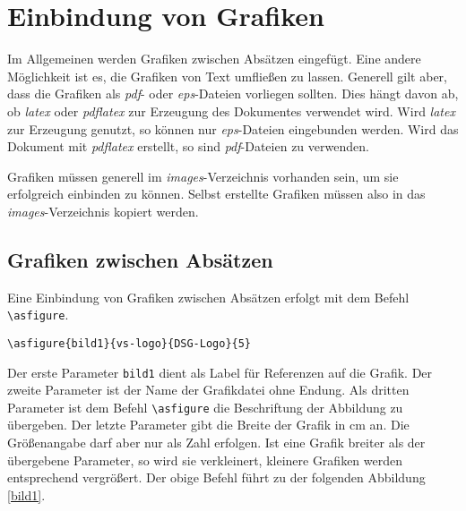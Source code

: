 %
\section{Einbindung von Grafiken}
%
Im Allgemeinen werden Grafiken zwischen Absätzen eingefügt. Eine andere
Möglichkeit ist es, die Grafiken von Text umfließen zu lassen. Generell gilt
aber, dass die Grafiken als \emph{pdf}- oder \emph{eps}-Dateien vorliegen
sollten. Dies hängt davon ab, ob \emph{latex} oder \emph{pdflatex} zur Erzeugung
des Dokumentes verwendet wird. Wird \emph{latex} zur Erzeugung genutzt, so
können nur \emph{eps}-Dateien eingebunden werden. Wird das Dokument mit
\emph{pdflatex} erstellt, so sind \emph{pdf}-Dateien zu verwenden.

Grafiken müssen generell im \emph{images}-Verzeichnis vorhanden sein, um sie
erfolgreich einbinden zu können. Selbst erstellte Grafiken müssen also in das
\emph{images}-Verzeichnis kopiert werden.

\subsection{Grafiken zwischen Absätzen}
%
Eine Einbindung von Grafiken zwischen Absätzen erfolgt mit dem Befehl
\texttt{\textbackslash asfigure}.
\begin{verbatim}
\asfigure{bild1}{vs-logo}{DSG-Logo}{5}
\end{verbatim}
Der erste Parameter \texttt{bild1} dient als Label für Referenzen auf die
Grafik. Der zweite Parameter ist der Name der Grafikdatei ohne Endung. Als
dritten Parameter ist dem Befehl \texttt{\textbackslash asfigure} die Beschriftung
der Abbildung zu übergeben. Der letzte Parameter gibt
die Breite der Grafik in cm an. Die Größenangabe darf aber nur als Zahl erfolgen.
Ist eine Grafik breiter als der übergebene Parameter, so wird sie verkleinert, kleinere Grafiken werden
entsprechend vergrößert. Der obige Befehl führt zu der folgenden Abbildung
\ref{bild1}.



